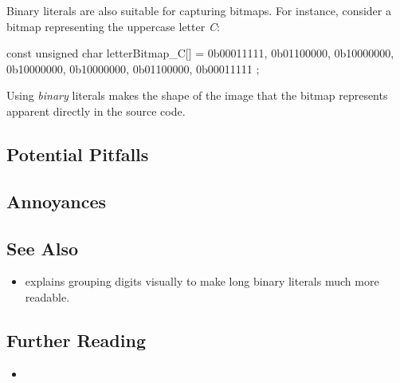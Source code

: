 Binary literals are also suitable for capturing bitmaps. For instance,
consider a bitmap representing the uppercase letter \textit{C}\/:

\begin{emcppslisting}
const unsigned char letterBitmap_C[] =
{
    0b00011111,
    0b01100000,
    0b10000000,
    0b10000000,
    0b10000000,
    0b01100000,
    0b00011111
};
\end{emcppslisting}


\noindent Using \emph{binary} literals makes the shape of the image that the
bitmap represents apparent directly in the source code.

\subsection[Potential Pitfalls]{Potential Pitfalls}\label{potential-pitfalls}

\hspace*{\fill}

\subsection[Annoyances]{Annoyances}\label{annoyances}

\hspace*{\fill}

\subsection[See Also]{See Also}\label{see-also}

\begin{itemize}
\item{%
explains grouping digits visually to make long binary literals much more readable.}
\end{itemize}

\subsection[Further Reading]{Further Reading}\label{further-reading}

\begin{itemize}
\item{\cite{informit}}
\end{itemize}


